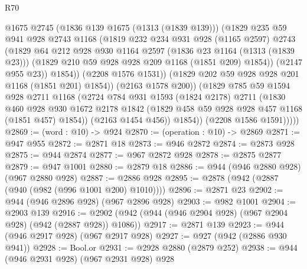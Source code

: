 \begin{lexlean}{R70}
\begin{coremodule}
                      @1675
                      @2745
                      (@1836 @139 @1675 (@1313 (@1839 @139)))
                      (@1829
                        @235
                        @59
                        @941
                        @928
                        @2743
                        @1168
                        (@1819
                          @232
                          @234
                          @931
                          @928
                          (@1165 @2597)
                          @2743
                          (@1829
                            @64
                            @212
                            @928
                            @930
                            @1164
                            @2597
                            (@1836 @23 @1164 (@1313 (@1839 @23)))
                            (@1829 @210 @59 @928 @928 @209 @1168 (@1851 @209) @1854))
                          (@2147 @955 @23))
                        @1854))
                    (@2208 @1576 @1531))
                  (@1829 @202 @59 @928 @928 @201 @1168 (@1851 @201) @1854))
                (@2163 @1578 @200))
              (@1829
                @785
                @59
                @1594
                @928
                @2711
                @1168
                (@2724
                  @784
                  @931
                  @1593
                  (@1824 @2178)
                  @2711
                  (@1830
                    @460
                    @928
                    @930
                    @1672
                    @2178
                    @1842
                    (@1829 @458 @59 @928 @928 @457 @1168 (@1851 @457) @1854))
                  (@2163 @1454 @456))
                @1854))
            (@2208 @1586 @1591)))))
@2869 := (word : @10) -> @924
@2870 := (operation : @10) -> @2869
@2871 := @947 @955
@2872 := @2871 @18
@2873 := @946 @2872
@2874 := @2873 @928
@2875 := @944 @2874
@2877 := @967 @2872 @928
@2878 := @2875 @2877
@2879 := @947 @1001
@2880 := @2879 @18
@2886 := @944 (@946 @2880 @928) (@967 @2880 @928)
@2887 := @2886 @928
@2895 := @2878 (@942 (@2887 (@940 (@982 (@996 @1001 @200) @1010))))
@2896 := @2871 @23
@2902 := @944 (@946 @2896 @928) (@967 @2896 @928)
@2903 := @982 @1001
@2904 := @2903 @139
@2916 := @2902 (@942 (@944 (@946 @2904 @928) (@967 @2904 @928) (@942 (@2887 @928)) @1086))
@2917 := @2871 @139
@2923 := @944 (@946 @2917 @928) (@967 @2917 @928)
@2927 := @927 (@942 (@2886 @930 @941))
@2928 := Bool.or
@2931 := @2928 @2880 (@2879 @252)
@2938 := @944 (@946 @2931 @928) (@967 @2931 @928) @928

\end{coremodule}
\end{lexlean}
